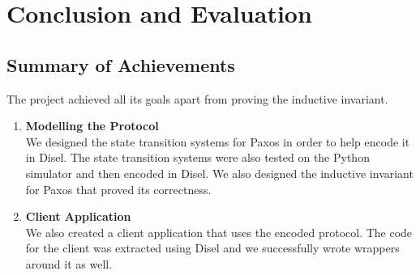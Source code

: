 \chapter{Conclusion and Evaluation}

\section{Summary of Achievements}
The project achieved all its goals apart from proving the inductive invariant.
\begin{enumerate}
  \item \textbf{Modelling the Protocol} \\
    We designed the state transition systems for Paxos in order to help encode it in
    Disel. The state transition systems were also tested on the Python simulator
    and then encoded in Disel. We also designed the inductive invariant for Paxos
    that proved its correctness.
  \item \textbf{Client Application} \\
    We also created a client application that uses the encoded protocol. The
    code for the client was extracted using Disel and we successfully wrote
    wrappers around it as well.
\end{enumerate}

